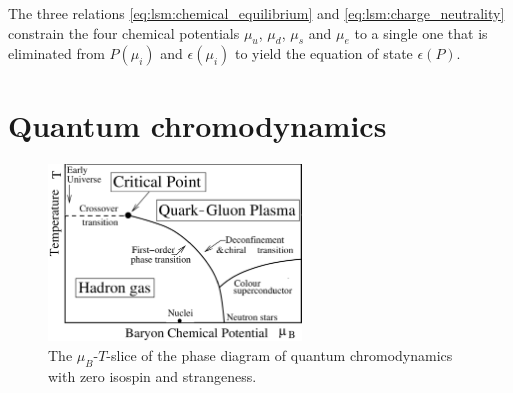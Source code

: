 The three relations \eqref{eq:lsm:chemical_equilibrium} and \eqref{eq:lsm:charge_neutrality}
constrain the four chemical potentials $\mu_u$, $\mu_d$, $\mu_s$ and $\mu_e$
to a single one that is eliminated from $P(\mu_i)$ and $\epsilon(\mu_i)$
to yield the equation of state $\epsilon(P)$.

\section{Quantum chromodynamics}
\label{sec:master_intro:qcd}

\begin{figure}[t]
\centering
\includegraphics[width=0.6\textwidth]{figures/qcd-phase-diagram.png}
\caption{%
	The $\mu_B$-$T$-slice of the phase diagram of quantum chromodynamics with zero isospin and strangeness.
}
\label{fig:qcd:phase_diagram}
\end{figure}

